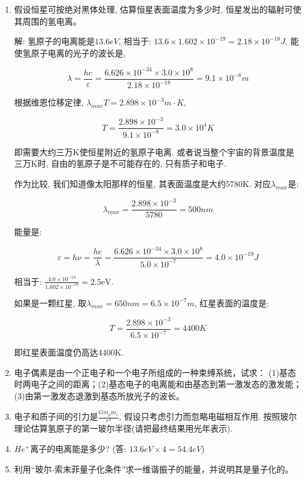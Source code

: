 \begin{enumerate}
\item 假设恒星可按绝对黑体处理, 估算恒星表面温度为多少时, 恒星发出的辐射可使其周围的氢电离。

解: 氢原子的电离能是$13.6eV$, 相当于: $13.6 \times 1.602 \times
10^{-19} = 2.18 \times 10^{-18} J$, 能使氢原子电离的光子的波长是,

\begin{equation*}
\lambda = \frac{hc}{\varepsilon}=\frac{6.626 \times 10^{-34} \times
3.0 \times 10^8}{2.18 \times 10^{-18}} = 9.1 \times 10^{-8}m
\end{equation*}

根据维恩位移定律, $\lambda_{max} T = 2.898 \times 10^{-3} m \cdot
K$,

\begin{equation*}
T = \frac{2.898 \times 10^{-3}}{9.1 \times 10^{-8}}=3.0\times 10^4 K
\end{equation*}

即需要大约三万K使恒星附近的氢原子电离.
或者说当整个宇宙的背景温度是三万K时, 自由的氢原子是不可能存在的,
只有质子和电子.

作为比较, 我们知道像太阳那样的恒星, 其表面温度是大约5780K.
对应$\lambda_{max}$是:

\begin{equation*}
\lambda_{max} = \frac{2.898 \times 10^{-3}}{5780} = 500 nm
\end{equation*}

能量是:

\begin{equation*}
\varepsilon =h \nu = \frac{hc}{\lambda}= \frac{6.626 \times 10^{-34}
\times 3.0 \times 10^8}{5.0 \times 10^{-7}}= 4.0 \times 10^{-19} J
\end{equation*}

相当于: $\frac{4.0 \times 10^{-19}}{1.602 \times 10^{-19}}=2.5
\text{eV}$.

如果是一颗红星, 取$\lambda_{max}=650 nm =6.5 \times 10^{-7}m$,
红星表面的温度是:

\begin{equation*}
T = \frac{2.898 \times 10^{-3}}{6.5 \times 10^{-7}}=4400K
\end{equation*}

即红星表面温度仍高达4400K.

  \item 电子偶素是由一个正电子和一个电子所组成的一种束缚系统，试求：
(1)基态时两电子之间的距离；(2)基态电子的电离能和由基态到第一激发态的激发能；
(3)由第一激发态退激到基态所放光子的波长。

\item 电子和质子间的引力是$\frac{Gm_pm_e}{r^2}$, 假设只考虑引力而忽略电磁相互作用. 按照玻尔理论估算氢原子的第一玻尔半径(请把最终结果用光年表示).

\item $He^+$离子的电离能是多少? (答: $13.6 eV \times 4 = 54.4 eV$)

\item 利用“玻尔-索末菲量子化条件”求一维谐振子的能量，并说明其是量子化的。

\end{enumerate}


